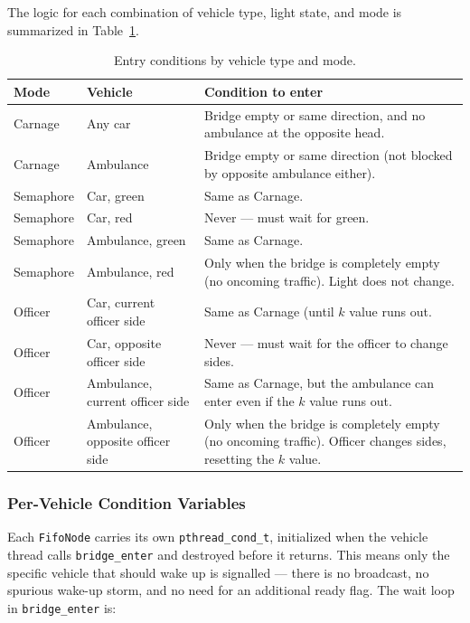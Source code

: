 \documentclass[12pt]{article}
\begin{document}
The logic for each combination of vehicle type, light state, and mode is
summarized in Table~\ref{tab:entry}.

\begin{table}[h!]
  \centering
  \caption{Entry conditions by vehicle type and mode.}
  \label{tab:entry}
  \begin{tabular}{llp{7.5cm}}
    \toprule
    \textbf{Mode} & \textbf{Vehicle} & \textbf{Condition to enter} \\
    \midrule
    Carnage  & Any car       & Bridge empty or same direction, and no ambulance at the opposite head. \\
    Carnage  & Ambulance     & Bridge empty or same direction (not blocked by opposite ambulance either). \\
    \midrule
    Semaphore & Car, green   & Same as Carnage. \\
    Semaphore & Car, red     & Never — must wait for green. \\
    Semaphore & Ambulance, green & Same as Carnage. \\
    Semaphore & Ambulance, red  & Only when the bridge is completely empty (no oncoming traffic). Light does not change. \\
    \bottomrule
    Officer & Car, current officer side   & Same as Carnage (until $k$ value runs out. \\
    Officer & Car, opposite officer side  & Never — must wait for the officer to change sides. \\
    Officer & Ambulance, current officer side & Same as Carnage, but the ambulance can enter even if the $k$ value runs out. \\
    Officer & Ambulance, opposite officer side & Only when the bridge is completely empty (no oncoming traffic). Officer changes sides, resetting the $k$ value.
  \end{tabular}
\end{table}

\subsubsection{Per-Vehicle Condition Variables}

Each \texttt{FifoNode} carries its own \texttt{pthread\_cond\_t},
initialized when the vehicle thread calls \texttt{bridge\_enter} and
destroyed before it returns. This means only the specific vehicle that
should wake up is signalled — there is no broadcast, no spurious wake-up
storm, and no need for an additional ready flag. The wait loop in
\texttt{bridge\_enter} is:
\end{document}
